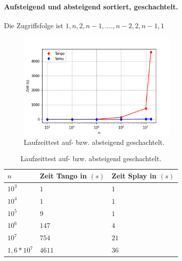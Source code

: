 \documentclass[a4paper,12pt]{article}
\begin{document}
\paragraph{Aufsteigend und absteigend sortiert, geschachtelt.}
Die Zugriffsfolge ist $1, n, 2, n- 1,...., n - 2, 2, n -1, 1$
\begin{figure}[H]
	\centering
	\includegraphics[width=0.7\textwidth]{"Medien/laufzeittest/diagramm/sorted3"}
	\caption{Laufzeittest auf- bzw. absteigend geschachtelt.}
\end{figure}
\begin{table}[H]
	\begin{center}
		\begin{tabular}[c]{|l|l|l|}
			\hline
			$n$ & Zeit Tango in $\left(s\right)$ &Zeit Splay in $\left(s\right)$ \\
			\hline
			$10^3$ & $1$ &$1$ \\
			\hline
			$10^4$  & $1$ &$1$  \\
			\hline
			$10^5$  & $9$ &$1$  \\
			\hline
			$10^6$  & $147$ &$4$  \\
			\hline
			$10^7$  & $754$ &$21$  \\
			\hline
			$1,6 *10^7$  & $4611$ &$36$  \\
			\hline
		\end{tabular}
		\caption{Laufzeittest auf- bzw. absteigend geschachtelt.} 
	\end{center}
\end{table}

\newpage


\end{document}
